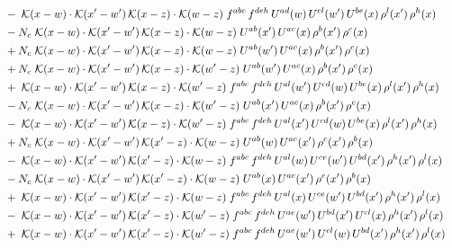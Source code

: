 \documentclass[9pt]{article}
\begin{document}
\begin{align}
&\quad -\;\mathcal{K}(x-w)\cdot\mathcal{K}(x'-w')\,\mathcal{K}(x-z)\cdot\mathcal{K}(w-z)\;f^{abc}\,f^{deh}\,U^{ad}(w)\,U^{cl}(w')\,U^{be}(x)\,\rho^{l}(x')\,\rho^{h}(x)\notag\\
&\quad -N_c\;\mathcal{K}(x-w)\cdot\mathcal{K}(x'-w')\,\mathcal{K}(x-z)\cdot\mathcal{K}(w-z)\;U^{ab}(x')\,U^{ac}(x)\,\rho^{b}(x')\,\rho^{c}(x)\notag\\
&\quad +N_c\;\mathcal{K}(x-w)\cdot\mathcal{K}(x'-w')\,\mathcal{K}(x-z)\cdot\mathcal{K}(w-z)\;U^{ab}(w')\,U^{ac}(x)\,\rho^{b}(x')\,\rho^{c}(x)\notag\\
&\quad +N_c\;\mathcal{K}(x-w)\cdot\mathcal{K}(x'-w')\,\mathcal{K}(x-z)\cdot\mathcal{K}(w'-z)\;U^{ab}(w')\,U^{ac}(x)\,\rho^{b}(x')\,\rho^{c}(x)\notag\\
&\quad +\;\mathcal{K}(x-w)\cdot\mathcal{K}(x'-w')\,\mathcal{K}(x-z)\cdot\mathcal{K}(w'-z)\;f^{abc}\,f^{deh}\,U^{al}(w')\,U^{cd}(w)\,U^{be}(x)\,\rho^{l}(x')\,\rho^{h}(x)\notag\\
&\quad -N_c\;\mathcal{K}(x-w)\cdot\mathcal{K}(x'-w')\,\mathcal{K}(x-z)\cdot\mathcal{K}(w'-z)\;U^{ab}(x')\,U^{ac}(x)\,\rho^{b}(x')\,\rho^{c}(x)\notag\\
&\quad -\;\mathcal{K}(x-w)\cdot\mathcal{K}(x'-w')\,\mathcal{K}(x-z)\cdot\mathcal{K}(w'-z)\;f^{abc}\,f^{deh}\,U^{al}(x')\,U^{cd}(w)\,U^{be}(x)\,\rho^{l}(x')\,\rho^{h}(x)\notag\\
&\quad +N_c\;\mathcal{K}(x-w)\cdot\mathcal{K}(x'-w')\,\mathcal{K}(x'-z)\cdot\mathcal{K}(w-z)\;U^{ab}(w)\,U^{ac}(x')\,\rho^{c}(x')\,\rho^{b}(x)\notag\\
&\quad -\;\mathcal{K}(x-w)\cdot\mathcal{K}(x'-w')\,\mathcal{K}(x'-z)\cdot\mathcal{K}(w-z)\;f^{abc}\,f^{deh}\,U^{al}(w)\,U^{ce}(w')\,U^{bd}(x')\,\rho^{h}(x')\,\rho^{l}(x)\notag\\
&\quad -N_c\;\mathcal{K}(x-w)\cdot\mathcal{K}(x'-w')\,\mathcal{K}(x'-z)\cdot\mathcal{K}(w-z)\;U^{ab}(x)\,U^{ac}(x')\,\rho^{c}(x')\,\rho^{b}(x)\notag\\
&\quad +\;\mathcal{K}(x-w)\cdot\mathcal{K}(x'-w')\,\mathcal{K}(x'-z)\cdot\mathcal{K}(w-z)\;f^{abc}\,f^{deh}\,U^{al}(x)\,U^{ce}(w')\,U^{bd}(x')\,\rho^{h}(x')\,\rho^{l}(x)\notag\\
&\quad -\;\mathcal{K}(x-w)\cdot\mathcal{K}(x'-w')\,\mathcal{K}(x'-z)\cdot\mathcal{K}(w'-z)\;f^{abc}\,f^{deh}\,U^{ae}(w')\,U^{bd}(x')\,U^{cl}(x)\,\rho^{h}(x')\,\rho^{l}(x)\notag\\
&\quad +\;\mathcal{K}(x-w)\cdot\mathcal{K}(x'-w')\,\mathcal{K}(x'-z)\cdot\mathcal{K}(w'-z)\;f^{abc}\,f^{deh}\,U^{ae}(w')\,U^{cl}(w)\,U^{bd}(x')\,\rho^{h}(x')\,\rho^{l}(x)\notag\\

\end{align}
\end{document}
